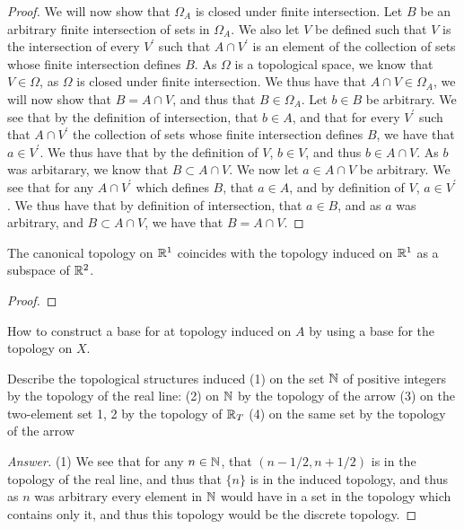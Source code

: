 \begin{proof}
  We will now show that $\Omega_A$ is closed under finite
  intersection. Let $B$ be an arbitrary finite intersection of sets in
  $\Omega_A$. We also let $V$ be defined such that $V$ is the
  intersection of every $V^\prime$ such that $A\cap V^\prime$ is an
  element of the collection of sets whose finite intersection defines
  $B$. As $\Omega$ is a topological space, we know that $V\in \Omega$,
  as $\Omega$ is closed under finite intersection. We thus have that
  $A\cap V \in \Omega_A$, we will now show that $B =A\cap V$, and thus
  that $B\in \Omega_A$. Let $b \in B$ be arbitrary. We see that by the
  definition of intersection, that $b \in A$, and that for every
  $V^\prime$ such that $A\cap V^\prime$ the collection of sets whose
  finite intersection defines $B$, we have that $a \in V^\prime$. We
  thus have that by the definition of $V$, $b\in V$, and thus $b \in A
  \cap V$. As $b$ was arbitarary, we know that $B \subset A \cap
  V$. We now let $a \in A \cap V$ be arbitrary. We see that for any $A
  \cap V^\prime$ which defines $B$, that $a \in A$, and by definition
  of $V$, $a \in V^\prime$. We thus have that by definition of
  intersection, that $a \in B$, and as $a$ was arbitrary, and 
  $B \subset A \cap V$, we have that $B = A \cap V$.
  
  
\end{proof}

\begin{majorEx}%
The canonical topology on $\mathbb{R}^1$ coincides with the topology induced on $\mathbb{R}^1$ as a subspace of $\mathbb{R}^2$.
\end{majorEx}
\begin{proof}
\end{proof}

\begin{minorEx}[Riddle]%
How to construct a base for at topology induced on $A$ by using a base for the topology on $X$.
\end{minorEx}

\begin{minorEx}%
Describe the topological structures induced
(1) on the set $\mathbb{N}$ of positive integers by the topology of the real line:
(2) on $\mathbb{N}$ by the topology of the arrow
(3) on the two-element set {1, 2} by the topology of $\mathbb{R}_T$
(4) on the same set by the topology of the arrow
\end{minorEx}

\begin{proof}[Answer]
  (1) We see that for any $n\in \mathbb{N}$, that $(n-1/2, n+1/2)$ is in the
  topology of the real line, and thus that $\{n\}$ is in the induced
  topology, and thus as $n$ was arbitrary every element in $\mathbb{N}$ would
  have in a set in the topology which contains only it, and thus this
  topology would be the discrete topology.
\end{proof}

